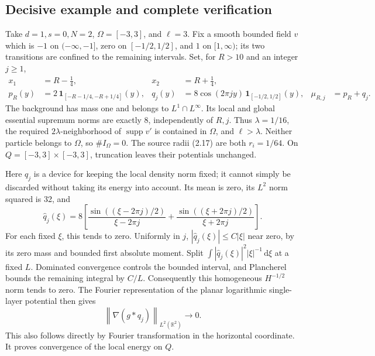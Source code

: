 \documentclass[10pt]{article}
\begin{document}
\subsection*{Decisive example and complete verification}
Take \(d=1,s=0,N=2\), \(\Omega=[-3,3]\), and \(\ell=3\). Fix a smooth bounded field \(v\) which is \(-1\) on \((-\infty,-1]\), zero on \([-1/2,1/2]\), and \(1\) on \([1,\infty)\); its two transitions are confined to the remaining intervals. Set, for \(R>10\) and an integer \(j\geq1\), \[\begin{aligned}
 x_1&=R-\tfrac14,&x_2&=R+\tfrac14,\\
 p_R(y)&=2\,\mathbf1_{[-R-1/4,-R+1/4]}(y),&
 q_j(y)&=8\cos(2\pi j y)\,\mathbf1_{[-1/2,1/2]}(y),&
 \mu_{R,j}&=p_R+q_j .\end{aligned}\] The background has mass one and belongs to \(L^1\cap L^\infty\). Its local and global essential supremum norms are exactly 8, independently of \(R,j\). Thus \(\lambda=1/16\), the required \(2\lambda\)-neighborhood of \(\operatorname{supp}v'\) is contained in \(\Omega\), and \(\ell>\lambda\). Neither particle belongs to \(\Omega\), so \(\#I_\Omega=0\). The source radii (2.17) are both \(r_i=1/64\). On \(Q=[-3,3]\times[-3,3]\), truncation leaves their potentials unchanged.\par
Here \(q_j\) is a device for keeping the local density norm fixed; it cannot simply be discarded without taking its energy into account. Its mean is zero, its \(L^2\) norm squared is 32, and \[\widehat q_j(\xi)=8\left[
 \frac{\sin((\xi-2\pi j)/2)}{\xi-2\pi j}
 +\frac{\sin((\xi+2\pi j)/2)}{\xi+2\pi j}\right].\] For each fixed \(\xi\), this tends to zero. Uniformly in \(j\), \(|\widehat q_j(\xi)|\leq C|\xi|\) near zero, by its zero mass and bounded first absolute moment. Split \(\int |\widehat q_j(\xi)|^2|\xi|^{-1}\,\mathrm d\xi\) at a fixed \(L\). Dominated convergence controls the bounded interval, and Plancherel bounds the remaining integral by \(C/L\). Consequently this homogeneous \(H^{-1/2}\) norm tends to zero. The Fourier representation of the planar logarithmic single-layer potential then gives \[\left\lVert \nabla(g*q_j)\right\rVert_{L^2(\mathbb R^2)}\longrightarrow0 .\] This also follows directly by Fourier transformation in the horizontal coordinate. It proves convergence of the local energy on \(Q\).\par
\end{document}
